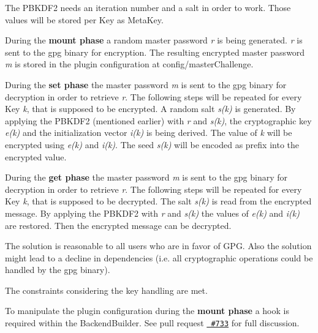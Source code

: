 The P\+B\+K\+D\+F2 needs an iteration number and a salt in order to work. Those values will be stored per Key as Meta\+Key.

During the {\bfseries{mount phase}} a random master password {\itshape r} is being generated. {\itshape r} is sent to the gpg binary for encryption. The resulting encrypted master password {\itshape m} is stored in the plugin configuration at {\ttfamily config/master\+Challenge}.

During the {\bfseries{set phase}} the master password {\itshape m} is sent to the gpg binary for decryption in order to retrieve {\itshape r}. The following steps will be repeated for every Key {\itshape k}, that is supposed to be encrypted. A random salt {\itshape s(k)} is generated. By applying the P\+B\+K\+D\+F2 (mentioned earlier) with {\itshape r} and {\itshape s(k)}, the cryptographic key {\itshape e(k)} and the initialization vector {\itshape i(k)} is being derived. The value of {\itshape k} will be encrypted using {\itshape e(k)} and {\itshape i(k)}. The seed {\itshape s(k)} will be encoded as prefix into the encrypted value.

During the {\bfseries{get phase}} the master password {\itshape m} is sent to the gpg binary for decryption in order to retrieve {\itshape r}. The following steps will be repeated for every Key {\itshape k}, that is supposed to be decrypted. The salt {\itshape s(k)} is read from the encrypted message. By applying the P\+B\+K\+D\+F2 with {\itshape r} and {\itshape s(k)} the values of {\itshape e(k)} and {\itshape i(k)} are restored. Then the encrypted message can be decrypted.

The solution is reasonable to all users who are in favor of G\+PG. Also the solution might lead to a decline in dependencies (i.\+e. all cryptographic operations could be handled by the gpg binary).

The constraints considering the key handling are met.

To manipulate the plugin configuration during the {\bfseries{mount phase}} a hook is required within the {\ttfamily Backend\+Builder}. See pull request \href{https://github.com/ElektraInitiative/libelektra/pull/733}{\texttt{ \#733}} for full discussion.